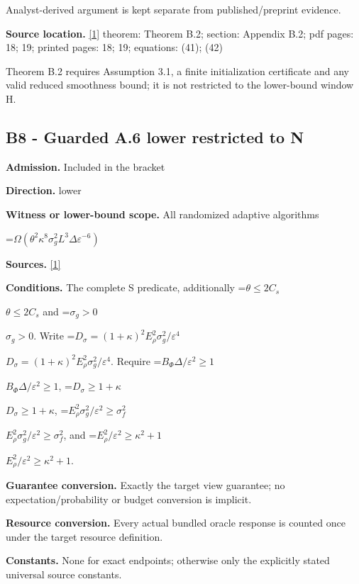 \documentclass[10pt,a4paper]{article}
\newcommand{\AtlasMath}[1]{\par\begingroup\centering\setbox0=\hbox{$\displaystyle #1$}\ifdim\wd0>1.4\linewidth\typeout{ATLAS WIDE FORMULA: \the\wd0}\fi\ifdim\wd0>\linewidth\resizebox{\linewidth}{!}{\box0}\else\box0\fi\par\endgroup}
\newcommand{\AtlasInlineMath}[1]{\begingroup\setbox0=\hbox{$#1$}\ifdim\wd0>.4\linewidth\endgroup\AtlasMath{#1}\else\endgroup$#1$\fi}
\begin{document}
Analyst-derived argument is kept separate from published/preprint evidence.



\textbf{Source location.} \href{https://arxiv.org/pdf/2610.03633v2}{[1]} theorem: Theorem B.2; section: Appendix B.2; pdf pages: 18; 19; printed pages: 18; 19; equations: (41); (42)



Theorem B.2 requires Assumption 3.1, a finite initialization certificate and any valid reduced smoothness bound; it is not restricted to the lower-bound window H.



\subsection{B8 - Guarded A.6 lower restricted to N}


\textbf{Admission.} Included in the bracket



\textbf{Direction.} lower



\textbf{Witness or lower-bound scope.} All randomized adaptive algorithms



\AtlasMath{\Omega(\theta^2\kappa^8\sigma_g^2L^3\Delta\varepsilon^{-6})}


\textbf{Sources.} \href{https://arxiv.org/pdf/2610.03633v2}{[1]}



\textbf{Conditions.} The complete S predicate, additionally \AtlasInlineMath{\theta\le2C_s} and \AtlasInlineMath{\sigma_g>0}. Write \AtlasInlineMath{D_\sigma=(1+\kappa)^2 E_\rho^2\sigma_g^2/\varepsilon^4}. Require \AtlasInlineMath{B_\Phi\Delta/\varepsilon^2\ge1}, \AtlasInlineMath{D_\sigma\ge1+\kappa}, \AtlasInlineMath{E_\rho^2\sigma_g^2/\varepsilon^2\ge\sigma_f^2}, and \AtlasInlineMath{E_\rho^2/\varepsilon^2\ge\kappa^2+1}.



\textbf{Guarantee conversion.} Exactly the target view guarantee; no expectation/probability or budget conversion is implicit.



\textbf{Resource conversion.} Every actual bundled oracle response is counted once under the target resource definition.



\textbf{Constants.} None for exact endpoints; otherwise only the explicitly stated universal source constants.
\end{document}
